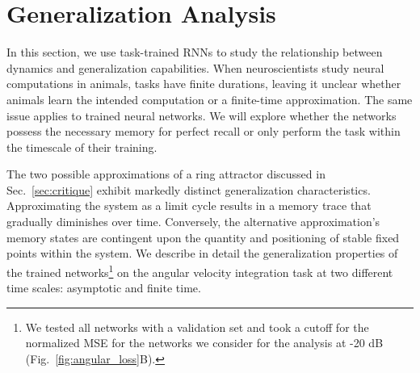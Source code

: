 \documentclass{article} %
\newcounter{ct}
\theoremstyle{definition}
\theoremstyle{remark}
\begin{document}
\section{Generalization Analysis}\label{sec:generalization}


In this section, we use task-trained RNNs to study the relationship between dynamics and generalization capabilities.
 When neuroscientists study neural computations in animals, tasks have finite durations, leaving it unclear whether animals learn the intended computation or a finite-time approximation.
  The same issue applies to trained neural networks.
   We will explore whether the networks possess the necessary memory for perfect recall or only perform the task within the timescale of their training.


The two possible approximations of a ring attractor discussed in Sec.~\ref{sec:critique} exhibit markedly distinct generalization characteristics.
Approximating the system as a limit cycle results in a memory trace that gradually diminishes over time.
Conversely, the alternative approximation's memory states are contingent upon the quantity and positioning of stable fixed points within the system.
We describe in detail the generalization properties of the trained networks\footnote{We tested all networks with a validation set and took a cutoff for the normalized MSE for the networks we consider for the analysis at -20 dB (Fig.~\ref{fig:angular_loss}B).} 
on the angular velocity integration task at two different time scales:  asymptotic and finite time.
\end{document}
